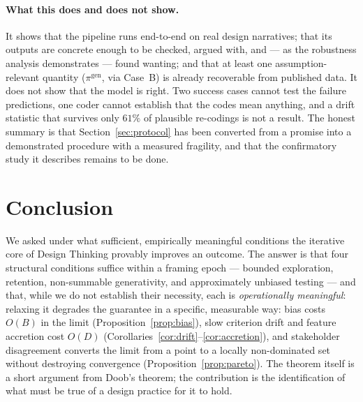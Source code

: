 \documentclass[11pt]{article}
\begin{document}
\paragraph{What this does and does not show.} It shows that the pipeline runs end-to-end on real design narratives; that its outputs are concrete enough to be checked, argued with, and --- as the robustness analysis demonstrates --- found wanting; and that at least one assumption-relevant quantity ($\pi^{\text{gen}}$, via Case~B) is already recoverable from published data. It does not show that the model is right. Two success cases cannot test the failure predictions, one coder cannot establish that the codes mean anything, and a drift statistic that survives only $61\%$ of plausible re-codings is not a result. The honest summary is that Section~\ref{sec:protocol} has been converted from a promise into a demonstrated procedure with a measured fragility, and that the confirmatory study it describes remains to be done.

\section{Conclusion}

We asked under what sufficient, empirically meaningful conditions the iterative core of Design Thinking provably improves an outcome. The answer is that four structural conditions suffice within a framing epoch --- bounded exploration, retention, non-summable generativity, and approximately unbiased testing --- and that, while we do not establish their necessity, each is \emph{operationally meaningful}: relaxing it degrades the guarantee in a specific, measurable way: bias costs $O(B)$ in the limit (Proposition~\ref{prop:bias}), slow criterion drift and feature accretion cost $O(D)$ (Corollaries~\ref{cor:drift}--\ref{cor:accretion}), and stakeholder disagreement converts the limit from a point to a locally non-dominated set without destroying convergence (Proposition~\ref{prop:pareto}). The theorem itself is a short argument from Doob's theorem; the contribution is the identification of what must be true of a design practice for it to hold.
\end{document}
